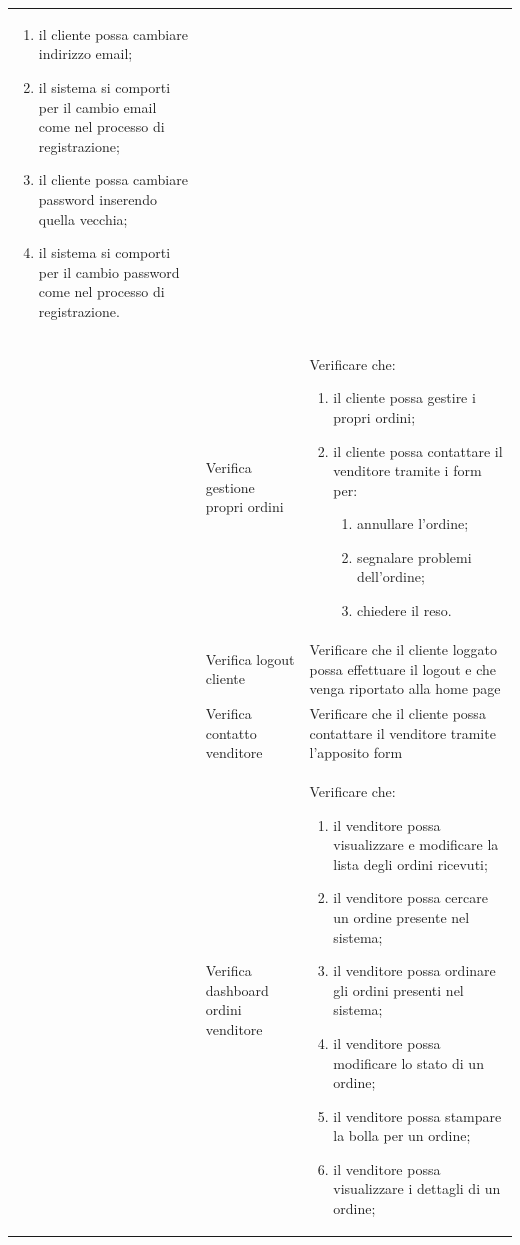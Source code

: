\begin{center}
\begin{longtable}{|p{1cm}|p{4.85cm}|p{9cm}|}
	\begin{enumerate}
		\item il cliente possa cambiare indirizzo email;
		\item il sistema si comporti per il cambio email come nel processo di registrazione;
		\item il cliente possa cambiare password inserendo quella vecchia;
		\item il sistema si comporti per il cambio password come nel processo di registrazione. 
	\end{enumerate} \\

	 & Verifica gestione propri ordini & Verificare che:
	\begin{enumerate}
		\item il cliente possa gestire i propri ordini;
		\item il cliente possa contattare il venditore tramite i form per:
		\begin{enumerate}
			\item annullare l'ordine;
			\item segnalare problemi dell'ordine;
			\item chiedere il reso.
		\end{enumerate}
	\end{enumerate} \\
	 & Verifica logout cliente & Verificare che il cliente loggato possa effettuare il logout e che venga riportato alla home page \\
	 & Verifica contatto venditore & Verificare che il cliente possa contattare il venditore tramite l'apposito form  \\
	 & Verifica dashboard ordini venditore & Verificare che:
	\begin{enumerate}
		\item il venditore possa visualizzare e modificare la lista degli ordini ricevuti;
		\item il venditore possa cercare un ordine presente nel sistema;
		\item il venditore possa ordinare gli ordini presenti nel sistema;
		\item il venditore possa modificare lo stato di un ordine;
		\item il venditore possa stampare la bolla per un ordine;
		\item il venditore possa visualizzare i dettagli di un ordine;
	\end{enumerate} \\

\end{longtable}
\end{center}
